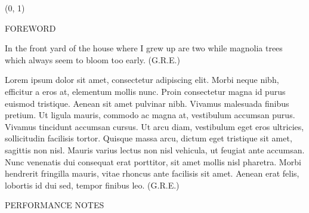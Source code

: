 \documentclass[11pt]{article}
\begin{document}
\begin{textblock}{23}(0, 1)
\begin{center}
\huge FOREWORD
\end{center}
\end{textblock}

\vspace*{0.25\baselineskip}

\begingroup
\begin{center}
In the front yard of the house where I grew up are two while magnolia trees which always seem to bloom too early.
\rightskip\leftskip
\phantom{text} \hfill (G.R.E.)
\end{center}
\endgroup

\vspace*{0.25\baselineskip}

\begingroup
\begin{center}
Lorem ipsum dolor sit amet, consectetur adipiscing elit. Morbi neque nibh, efficitur a eros at, elementum mollis nunc. Proin consectetur magna id purus euismod tristique. Aenean sit amet pulvinar nibh. Vivamus malesuada finibus pretium. Ut ligula mauris, commodo ac magna at, vestibulum accumsan purus. Vivamus tincidunt accumsan cursus. Ut arcu diam, vestibulum eget eros ultricies, sollicitudin facilisis tortor. Quisque massa arcu, dictum eget tristique sit amet, sagittis non nisl. Mauris varius lectus non nisl vehicula, ut feugiat ante accumsan. Nunc venenatis dui consequat erat porttitor, sit amet mollis nisl pharetra. Morbi hendrerit fringilla mauris, vitae rhoncus ante facilisis sit amet. Aenean erat felis, lobortis id dui sed, tempor finibus leo.
\rightskip\leftskip
\phantom{text} \hfill (G.R.E.)
\end{center}
\endgroup

\vspace*{1.25\baselineskip}

\begin{center}
\huge PERFORMANCE NOTES
\end{center}
\end{document}
